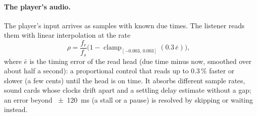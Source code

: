 \paragraph{The player's audio.} The player's input arrives as samples with known due times. The listener reads them with
linear interpolation at the rate
\begin{equation}
  \rho = \frac{f_r}{f_s}\bigl(1 - \operatorname{clamp}_{[-0.003,\,0.003]}(0.3\,\bar e)\bigr),
\end{equation}
where $\bar e$ is the timing error of the read head (due time minus now, smoothed over about half a second): a proportional
control that reads up to 0.3\,\% faster or slower (a few cents) until the head is on time. It absorbs different sample
rates, sound cards whose clocks drift apart and a settling delay estimate without a gap; an error beyond
\SI{\pm120}{ms} (a stall or a pause) is resolved by skipping or waiting instead.
